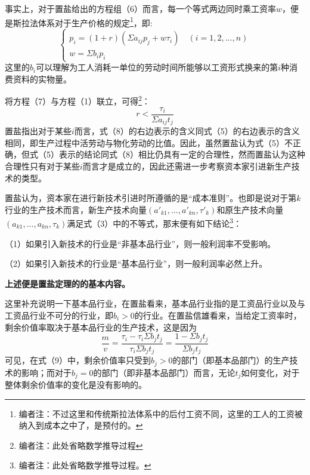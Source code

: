 \documentclass[a4paper,twoside,12pt,AutoFakeBold]{ctexart}
\begin{document}
事实上，对于置盐给出的方程组（6）而言，每一个等式两边同时乘工资率$w$，便是斯拉法体系对于生产价格的规定\footnote{编者注：不过这里和传统斯拉法体系中的后付工资不同，这里的工人的工资被纳入到成本之中了，是预付的。}，即:
\begin{equation}\tag{7}
    \begin{cases}
         p_i=(1+r)(\Sigma a_{ij}p_j+w\tau_i)\quad(i=1,2,...,n)\\
        w=\Sigma b_ip_i
    \end{cases}
\end{equation}
这里的$b_i$可以理解为工人消耗一单位的劳动时间所能够以工资形式换来的第$i$种消费资料的实物量。

将方程（7）与方程（1）联立，可得\footnote{编者注：此处省略数学推导过程}：
\begin{equation}\tag{8}
    r<\frac{\tau_i}{\Sigma a_{ij}t_j}
\end{equation}
置盐指出对于某些$i$而言，式（8）的右边表示的含义同式（5）的右边表示的含义相同，即生产过程中活劳动与物化劳动的比值。因此，虽然置盐认为式（5）不正确，但式（5）表示的结论同式（8）相比仍具有一定的合理性，然而置盐认为这种合理性只有对于某些$i$而言才是成立的，因此还需进一步考察资本家引进新生产技术的类型。

置盐认为，资本家在进行新技术引进时所遵循的是“成本准则”。也即是说对于第$k$行业的生产技术而言，新生产技术向量$(a'_{k1},...,a'_{kn},\tau'_k)$和原生产技术向量$(a_{k1},...,a_{kn},\tau_k)$满足式（3）中的不等式，那末便有如下结论\footnote{编者注：此处省略数学推导过程。}：

（1）如果引入新技术的行业是“非基本品行业”，则一般利润率不受影响。

（2）如果引入新技术的行业是“基本品行业”，则一般利润率必然上升。

\vspace{0.5cm} %

\textbf{上述便是置盐定理的的基本内容。}

这里补充说明一下基本品行业，在置盐看来，基本品行业指的是工资品行业以及与工资品行业不可分的行业，即$b_i>0$的行业。在置盐信雄看来，当给定工资率时，剩余价值率取决于基本品行业的生产技术，这是因为
\begin{equation}\tag{9}
\frac{m}{v}=\frac{\tau_i-\tau_i\Sigma b_jt_j}{\tau_i\Sigma b_jt_j}=\frac{1-\Sigma b_jt_j}{\Sigma b_jt_j}    
\end{equation}
可见，在式（9）中，剩余价值率只受到$b_j>0$的部门（即基本品部门）的生产技术的影响；而对于$b_j=0$的部门（即非基本品部门）而言，无论$t_j$如何变化，对于整体剩余价值率的变化是没有影响的。
\end{document}

